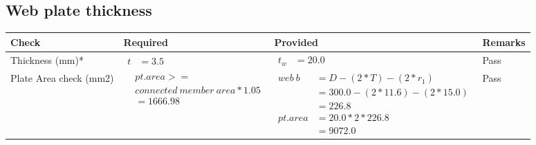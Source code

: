 \documentclass{article}%
\begin{document}
%
\newpage%
\subsection{Web plate thickness}%
\label{subsec:Webplatethickness}%
\renewcommand{\arraystretch}{1.2}%
\begin{longtable}{|p{2.5cm}|p{4.5cm}|p{7cm}|p{1.5cm}|}%
\hline%
\rowcolor{OsdagGreen}%
Check&Required&Provided&Remarks\\%
\hline%
\endhead%
\hline%
Thickness (mm)*&$\begin{aligned} t &=3.5\end{aligned}$&$\begin{aligned} t_w &=20.0\end{aligned}$&Pass\\%
\hline%
Plate Area check (mm2)&$\begin{aligned} &pt.area >= \\&connected~member~area * 1.05\\  &= 1666.98\end{aligned}$&$\begin{aligned} web~b &= D-(2*T)-(2*r_1)\\ &=300.0-(2*11.6)-(2*15.0)\\ &= 226.8 \\  pt.area &= 20.0*2* 226.8\\ &= 9072.0\end{aligned}$&Pass\\%
\hline%
\end{longtable}

%
\newpage%
\end{document}
